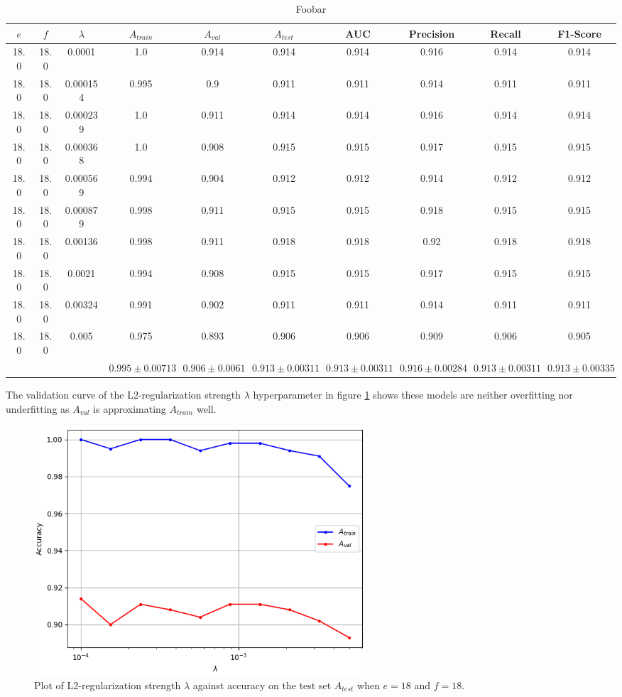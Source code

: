 \begin{table}[ht]
\centering
\begin{tabular}{ |c|c|c|c|c|c|c|c|c|c| }
\hline
$e$ & $f$ & $\lambda$ & $A_{train}$ & $A_{val}$ & $A_{test}$ & AUC & Precision & Recall & F1-Score \\
\hline
18.0 & 18.0 & 0.0001 & 1.0 & 0.914 & 0.914 & 0.914 & 0.916 & 0.914 & 0.914 \\
18.0 & 18.0 & 0.000154 & 0.995 & 0.9 & 0.911 & 0.911 & 0.914 & 0.911 & 0.911 \\
18.0 & 18.0 & 0.000239 & 1.0 & 0.911 & 0.914 & 0.914 & 0.916 & 0.914 & 0.914 \\
18.0 & 18.0 & 0.000368 & 1.0 & 0.908 & 0.915 & 0.915 & 0.917 & 0.915 & 0.915 \\
18.0 & 18.0 & 0.000569 & 0.994 & 0.904 & 0.912 & 0.912 & 0.914 & 0.912 & 0.912 \\
18.0 & 18.0 & 0.000879 & 0.998 & 0.911 & 0.915 & 0.915 & 0.918 & 0.915 & 0.915 \\
18.0 & 18.0 & 0.00136 & 0.998 & 0.911 & 0.918 & 0.918 & 0.92 & 0.918 & 0.918 \\
18.0 & 18.0 & 0.0021 & 0.994 & 0.908 & 0.915 & 0.915 & 0.917 & 0.915 & 0.915 \\
18.0 & 18.0 & 0.00324 & 0.991 & 0.902 & 0.911 & 0.911 & 0.914 & 0.911 & 0.911 \\
18.0 & 18.0 & 0.005 & 0.975 & 0.893 & 0.906 & 0.906 & 0.909 & 0.906 & 0.905 \\
\hline
 & & & $0.995\pm0.00713$ & $0.906\pm0.0061$ & $0.913\pm0.00311$ & $0.913\pm0.00311$ & $0.916\pm0.00284$ & $0.913\pm0.00311$ & $0.913\pm0.00335$ \\
\hline
\end{tabular}
\caption{Foobar}
\label{table:vgg16_total}
\end{table}

The validation curve of the L2-regularization strength $\lambda$ hyperparameter in figure \ref{fig:vgg16_total_lambda} shows these models are neither overfitting nor underfitting as $A_{val}$ is approximating $A_{train}$ well.

\begin{figure}[ht]
    \centering
    \includegraphics[width=0.6\textwidth]{figs/vgg16_total_lambda.png}
    \caption{Plot of L2-regularization strength $\lambda$ against accuracy on the test set $A_{test}$ when $e = 18$ and $f = 18$.}
    \label{fig:vgg16_total_lambda}
\end{figure}

